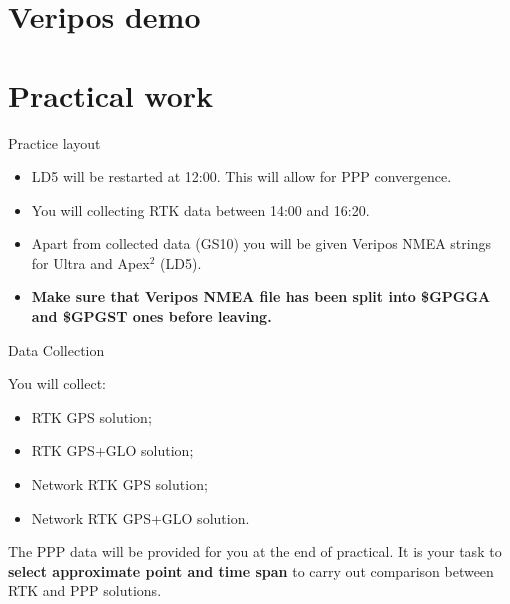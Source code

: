 \documentclass[11pt]{beamer}
\begin{document}
\section{Veripos demo}



\section{Practical work}

\begin{frame}{Practice layout}
	
	\begin{itemize}
		\item LD5 will be restarted at 12:00. This will allow for PPP convergence. 
		\item You will collecting RTK data between 14:00 and 16:20. 
		\item Apart from collected data (GS10) you will be given Veripos NMEA strings for Ultra and Apex$^2$ (LD5).
		\item \textbf{Make sure that Veripos NMEA file has been split into \$GPGGA and \$GPGST ones before leaving.}
	\end{itemize}

\end{frame}

\begin{frame}{Data Collection}
	
	You will  collect:
		\begin{itemize}
			\item RTK GPS solution;
			\item RTK GPS+GLO solution;
			\item Network RTK GPS solution;
			\item Network RTK GPS+GLO solution.
		\end{itemize}

	The PPP data will be provided for you at the end of practical. It is your task to \textbf{select approximate point and time span} to carry out comparison between RTK and PPP solutions. 

\end{frame}
\end{document}
